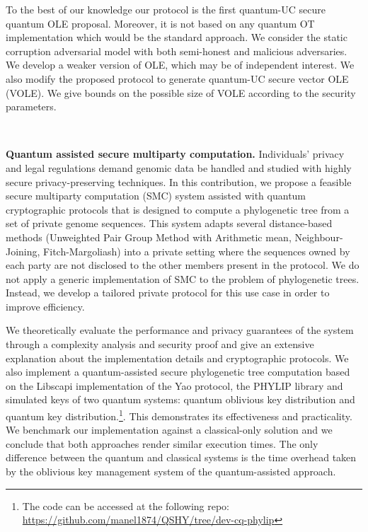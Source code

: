 To the best of our knowledge our protocol is the first quantum-UC secure quantum OLE proposal. Moreover, it is not based on any quantum OT implementation which would be the standard approach. %
We consider the static corruption adversarial model with both semi-honest and malicious adversaries. We develop a weaker version of OLE, which may be of independent interest. We also modify the proposed protocol to generate quantum-UC secure vector OLE (VOLE). We give bounds on the possible size of VOLE according to the security parameters.

\

\noindent\textbf{Quantum assisted secure multiparty computation.} Individuals’ privacy and legal regulations demand genomic data be handled and studied with highly secure privacy-preserving techniques. In this contribution, we propose a feasible secure multiparty computation (SMC) system assisted with quantum cryptographic protocols that is designed to compute a phylogenetic tree from a set of private genome sequences. This system adapts several distance-based methods (Unweighted Pair Group Method with Arithmetic mean, Neighbour-Joining, Fitch-Margoliash) into a private setting where the sequences owned by each party are not disclosed to the other members present in the protocol. We do not apply a generic implementation of SMC to the problem of phylogenetic trees. Instead, we develop a tailored private protocol for this use case in order to improve efficiency. 

We theoretically evaluate the performance and privacy guarantees of the system through a complexity analysis and security proof and give an extensive explanation about the implementation details and cryptographic protocols. We also implement a quantum-assisted secure phylogenetic tree computation based on the Libscapi implementation of the Yao protocol, the PHYLIP library and simulated keys of two quantum systems: quantum oblivious key distribution and quantum key distribution.\footnote{ The code can be accessed at the following repo: \href{https://github.com/manel1874/QSHY/tree/dev-cq-phylip}{https://github.com/manel1874/QSHY/tree/dev-cq-phylip}}. This demonstrates its effectiveness and practicality. We benchmark our implementation against a classical-only solution and we conclude that both approaches render similar execution times. The only difference between the quantum and classical systems is the time overhead taken by the oblivious key management system of the quantum-assisted approach.

